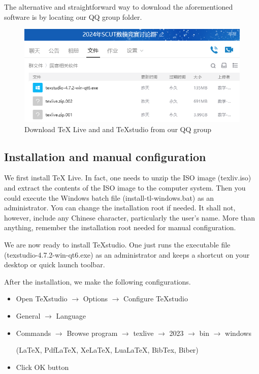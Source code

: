 \documentclass[12pt]{article}  %
\begin{document}
 The alternative and straightforward way to download the aforementioned software is by locating our QQ group folder.
 
 \begin{figure}[htbp]  %
     
     \centering  %
     \includegraphics[width=.5\textwidth]{Download_Softwares.png} %
     \caption{Download TeX Live and and TeXstudio from our QQ group} %
     \label{fig3}%
 \end{figure}
 
 \subsection{Installation and manual configuration}
 
 We first install TeX Live. In fact, one needs to unzip the ISO image (texliv.iso) and extract the contents of the ISO image to the computer system. Then you could execute the Windows batch file (install-tl-windows.bat) as an administrator. You can change the installation root if needed. It shall not, however, include any Chinese character, particularly the user's name. More than anything, remember the installation root needed for manual configuration.
 
 We are now ready to install TeXstudio. One just runs the executable file (texstudio-4.7.2-win-qt6.exe) as an administrator and keeps a shortcut on your desktop or quick launch toolbar.
 
 After the installation, we make the following configurations.
 
 \begin{itemize}
     \setlength{\parsep}{0ex} %
     \setlength{\topsep}{2ex} %
     \setlength{\itemsep}{1ex} %
     \item Open TeXstudio $\to$ Options $\to$ Configure TeXstudio
     \item General $\to$ Language
     \item Commands $\to$ Browse program $\to$ texlive $\to$ 2023 $\to$ bin $\to$ windows
     
     (LaTeX, PdfLaTeX, XeLaTeX, LuaLaTeX, BibTex, Biber)
     \item Click OK button
 \end{itemize}
 
\end{document}
